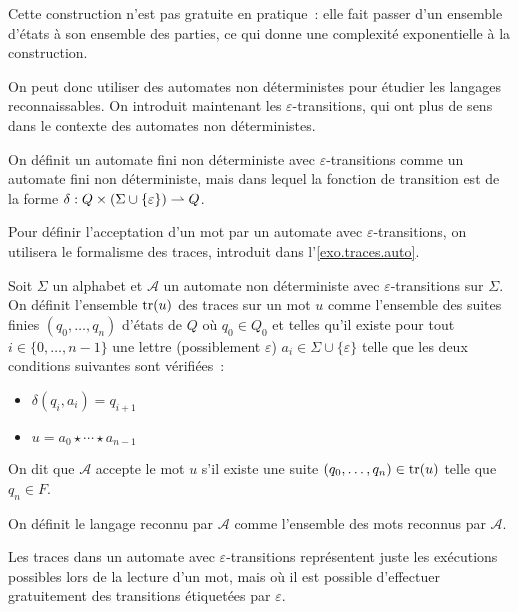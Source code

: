 \begin{remark}
  Cette construction n'est pas gratuite en pratique~: elle fait passer d'un
  ensemble d'états à son ensemble des parties, ce qui donne une complexité
  exponentielle à la construction.
\end{remark}

On peut donc utiliser des automates non déterministes pour étudier les langages
reconnaissables. On introduit maintenant les $\varepsilon$-transitions, qui
ont plus de sens dans le contexte des automates non déterministes.

\begin{definition}
  On définit un automate fini non déterministe avec $\varepsilon$-transitions
  comme un automate fini non déterministe, mais dans lequel la fonction de
  transition est de la forme
  $\delta : Q\times (\Sigma \cup \{\varepsilon\}) \rightharpoonup Q$.
\end{definition}

Pour définir l'acceptation d'un mot par un automate avec
$\varepsilon$-transitions, on utilisera le formalisme des traces, introduit dans
l'\cref{exo.traces.auto}.

\begin{definition}
  Soit $\Sigma$ un alphabet et $\mathcal A$ un automate non déterministe avec
  $\varepsilon$-transitions sur $\Sigma$. On définit l'ensemble $\operatorname{tr}(u)$ des
  traces sur un mot $u$ comme l'ensemble des suites finies $(q_0,\ldots,q_n)$
  d'états de $Q$ où $q_0 \in Q_0$ et telles qu'il existe pour tout
  $i \in \{0,\ldots,n-1\}$ une lettre (possiblement $\varepsilon$)
  $a_i \in \Sigma\cup\{\varepsilon\}$ telle que les deux conditions
  suivantes sont vérifiées~:
  \begin{itemize}
  \item $\delta(q_i,a_i) = q_{i+1}$
  \item $u = a_0\star\cdots\star a_{n-1}$
  \end{itemize}
  On dit que $\mathcal A$ accepte le mot $u$
  s'il existe une suite $(q_0,\ldots,q_n) \in \operatorname{tr}(u)$ telle que $q_n \in F$.

  On définit le langage reconnu par $\mathcal A$ comme l'ensemble des mots
  reconnus par $\mathcal A$.
\end{definition}

Les traces dans un automate avec $\varepsilon$-transitions représentent juste
les exécutions possibles lors de la lecture d'un mot, mais où il est possible
d'effectuer gratuitement des transitions étiquetées par $\varepsilon$.

